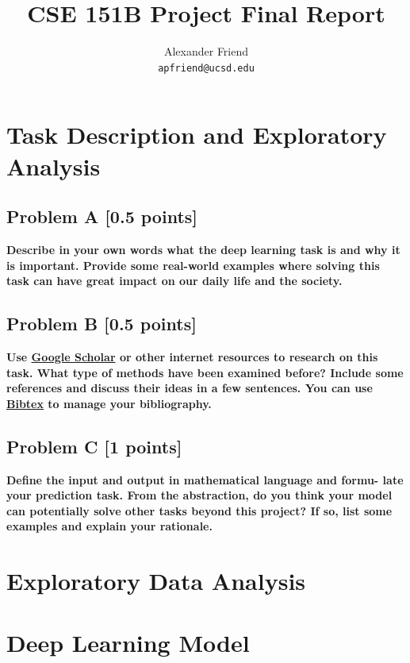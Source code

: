 \documentclass{article}
\title{CSE 151B Project Final Report}
\author{%
  Alexander Friend \\
  \texttt{apfriend@ucsd.edu} \\
}
\begin{document}
  \maketitle

  \section{Task Description and Exploratory Analysis}
    \subsection{Problem A [0.5 points]}
        
      \textbf{Describe in your own words what the deep learning task is and
      why it is important. Provide some real-world examples where solving this task can have
      great impact on our daily life and the society.}
    
    \subsection{Problem B [0.5 points]}

      \textbf{Use \href{https://scholar.google.com/}{Google Scholar} or other internet resources to research on
      this task. What type of methods have been examined before? Include some references and
      discuss their ideas in a few sentences. You can use 
      \href{https://www.overleaf.com/learn/latex/Bibliography_management_with_bibtex}{Bibtex} 
      to manage your bibliography.}

    \subsection{Problem C [1 points]}        

      \textbf{Define the input and output in mathematical language and formu-
      late your prediction task. From the abstraction, do you think your model can potentially
      solve other tasks beyond this project? If so, list some examples and explain your rationale.}
              
  \section{Exploratory Data Analysis}

  \section{Deep Learning Model}
  \label{gen_inst}
\end{document}
